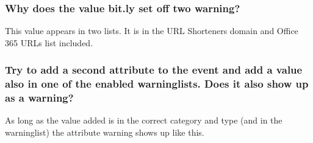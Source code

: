 \subsubsection{Why does the value bit.ly set off two warning?}
This value appears in two lists. It is in the URL Shorteners domain and Office 365 URLs list included.

\subsubsection{Try to add a second attribute to the event and add a value also in one of the enabled warninglists. Does it also show up as a warning?}
As long as the value added is in the correct category and type (and in the warninglist) the attribute warning shows up like this.

